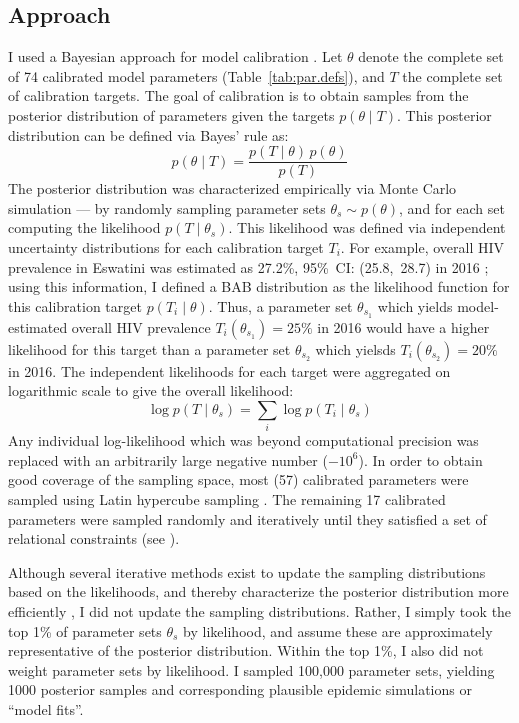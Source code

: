 \subsection{Approach}\label{model.cal.appr}
I used a Bayesian approach for model calibration \cite{Menzies2017}.
Let $\theta$ denote the complete set of 74 calibrated model parameters (Table~\ref{tab:par.defs}),
and $T$ the complete set of calibration targets.
The goal of calibration is to obtain samples from
the posterior distribution of parameters given the targets $p(\theta \mid T)$.
This posterior distribution can be defined via Bayes' rule as:
\begin{equation}
  p(\theta \mid T) = \frac{p(T \mid \theta)\,p(\theta)}{p(T)}
\end{equation}
The posterior distribution was characterized empirically via Monte Carlo simulation
--- \ie by randomly sampling parameter sets $\theta_s \sim p(\theta)$,
and for each set computing the likelihood $p(T \mid \theta_s)$.
This likelihood was defined via
independent uncertainty distributions for each calibration target $T_i$.
For example, overall HIV prevalence in Eswatini was estimated as
27.2\%, 95\%~CI: (25.8,~28.7) in 2016 \cite{SHIMS2};
using this information, I defined a BAB distribution
as the likelihood function for this calibration target $p(T_i \mid \theta)$.
Thus, a parameter set $\theta_{s_1}$ which yields
model-estimated overall HIV prevalence $T_i(\theta_{s_1}) = 25\%$ in 2016
would have a higher likelihood for this target than
a parameter set $\theta_{s_2}$ which yielsds $T_i(\theta_{s_2}) = 20\%$ in 2016.
The independent likelihoods for each target were aggregated on logarithmic scale
to give the overall likelihood:
\begin{equation}
  \log p(T \mid \theta_s) = \sum_i \log p(T_i \mid \theta_s)
\end{equation}
Any individual log-likelihood which was beyond computational precision was replaced with
an arbitrarily large negative number ($-{10}^6$).
In order to obtain good coverage of the sampling space,
most (57) calibrated parameters were sampled using Latin hypercube sampling \cite{Stein1987}.
The remaining 17 calibrated parameters were sampled randomly and iteratively
until they satisfied a set of relational constraints (see ).
\par
Although several iterative methods exist to
update the sampling distributions based on the likelihoods,
and thereby characterize the posterior distribution more efficiently \cite{Menzies2017},
I did not update the sampling distributions.
Rather, I simply took the top 1\% of parameter sets $\theta_s$ by likelihood,
and assume these are approximately representative of the posterior distribution.
Within the top 1\%, I also did not weight parameter sets by likelihood.
I sampled 100,000 parameter sets, yielding 1000 posterior samples and
corresponding plausible epidemic simulations or ``model fits''.
